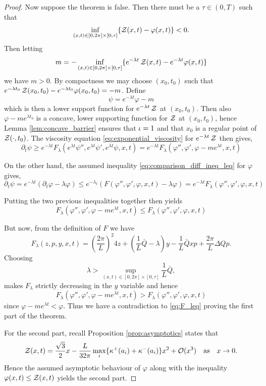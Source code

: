 \documentclass[11pt]{amsart}
\begin{document}
\begin{proof}
Now suppose the theorem is false. Then there must be a $\tau \in (0, T)$ such that
\[
\inf_{(x, t) \in [0, 2\pi] \times [0,\tau]} \{\operatorname{\mathcal{Z}}(x, t) - \varphi(x, t)\}  < 0.
\]
Then letting
\[
m = -\inf_{(x, t) \in [0, 2\pi] \times [0,\tau]} \{e^{-\lambda t} \operatorname{\mathcal{Z}}(x, t) - e^{-\lambda t} \varphi(x, t)\}
\]
we have $m > 0$. By compactness we may choose $(x_0, t_0)$ such that $e^{-\lambda t_0} \operatorname{\mathcal{Z}}(x_0, t_0) - e^{-\lambda t_0} \varphi(x_0, t_0) = -m$. Define
\[
\psi = e^{-\lambda t} \varphi - m
\]
which is then a lower support function for $e^{-\lambda t} \operatorname{\mathcal{Z}}$ at $(x_0, t_0)$. Then also $\varphi - m e^{\lambda t_0}$ is a concave, lower supporting function for $\operatorname{\mathcal{Z}}$ at $(x_0, t_0)$, hence Lemma \ref{lem:concave_barrier} ensures that $\operatorname{\iota} = 1$ and that $x_0$ is a regular point of $\operatorname{\mathcal{Z}}(\cdot, t_0)$. The viscosity equation \eqref{eq:exponential_viscosity} for $e^{-\lambda t}\operatorname{\mathcal{Z}}$ then gives,
\[
\partial_t \psi \geq e^{-\lambda t} F_{\lambda} (e^{\lambda t} \psi'', e^{\lambda t} \psi', e^{\lambda t} \psi, x, t) = e^{-\lambda t} F_{\lambda} (\varphi'', \varphi', \varphi - m e^{\lambda t}, x, t)
\]

On the other hand, the assumed inequality \eqref{eq:comparison_diff_ineq_leq} for $\varphi$ gives,
\[
\partial_t \psi = e^{-\lambda t} (\partial_t \varphi - \lambda \varphi) \leq e^{-\lambda_t}(F(\varphi'', \varphi', \varphi, x, t)  - \lambda \varphi) = e^{-\lambda t} F_{\lambda}(\varphi'', \varphi', \varphi, x, t)
\]

Putting the two previous inequalities together then yields
\begin{equation}
\label{eq:F_leq}
F_{\lambda} (\varphi'', \varphi', \varphi - m e^{\lambda t}, x, t) \leq F_{\lambda}(\varphi'', \varphi', \varphi, x, t)
\end{equation}

But now, from the definition of $F$ we have
\[
F_{\lambda} (z, p, y, x, t) = \left(\frac{2\pi}{L}\right)^2 4 z + (\frac{1}{L} \bar{Q} - \lambda) y - \frac{1}{L} \bar{Q} x p + \frac{2\pi}{L} \Delta Q p.
\]
Choosing
\[
\lambda > \sup_{(x, t) \in [0, 2\pi] \times [0, \tau]} \frac{1}{L} \bar{Q},
\]
makes $F_{\lambda}$ strictly decreasing in the $y$ variable and hence
\[
F_{\lambda} (\varphi'', \varphi', \varphi - m e^{\lambda t}, x, t) > F_{\lambda}(\varphi'', \varphi', \varphi, x, t)
\]
since $\varphi - m e^{\lambda t} < \varphi$. Thus we have a contradiction to \eqref{eq:F_leq} proving the first part of the theorem.

For the second part, recall Proposition \ref{prop:asymptotics} states that
\[
\operatorname{\mathcal{Z}}(x, t) = \frac{\sqrt{3}}{2}x - \frac{L}{32\pi} \max_i \{\operatorname{\kappa}^+(a_i) + \operatorname{\kappa}^-(a_i)\} x^2 + \operatorname{\mathcal{O}}(x^3) \quad \text{as} \quad x \to 0.
\]
Hence the assumed asymptotic behaviour of $\varphi$ along with the inequality $\varphi(x, t) \leq \operatorname{\mathcal{Z}}(x, t)$ yields the second part.
\end{proof}
\end{document}

